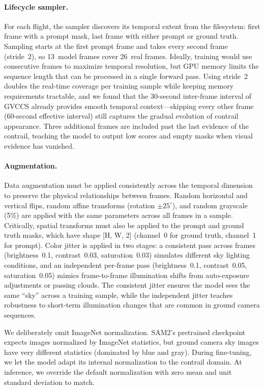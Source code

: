 \documentclass[review]{elsarticle}
\begin{document}
\paragraph{Lifecycle sampler.} For each flight, the sampler discovers its temporal extent from the filesystem: first frame with a prompt mask, last frame with either prompt or ground truth. Sampling starts at the first prompt frame and takes every second frame (stride~2), so 13~model frames cover 26~real frames. Ideally, training would use consecutive frames to maximize temporal resolution, but GPU memory limits the sequence length that can be processed in a single forward pass. Using stride~2 doubles the real-time coverage per training sample while keeping memory requirements tractable, and we found that the 30-second inter-frame interval of GVCCS already provides smooth temporal context---skipping every other frame (60-second effective interval) still captures the gradual evolution of contrail appearance. Three additional frames are included past the last evidence of the contrail, teaching the model to output low scores and empty masks when visual evidence has vanished.

\paragraph{Augmentation.} Data augmentation must be applied consistently across the temporal dimension to preserve the physical relationships between frames. Random horizontal and vertical flips, random affine transforms (rotation $\pm 25^{\circ}$), and random grayscale (5\%) are applied with the same parameters across all frames in a sample. Critically, spatial transforms must also be applied to the prompt and ground truth masks, which have shape [H, W, 2] (channel~0 for ground truth, channel~1 for prompt). Color jitter is applied in two stages: a consistent pass across frames (brightness~0.1, contrast~0.03, saturation~0.03) simulates different sky lighting conditions, and an independent per-frame pass (brightness~0.1, contrast~0.05, saturation~0.05) mimics frame-to-frame illumination shifts from auto-exposure adjustments or passing clouds. The consistent jitter ensures the model sees the same ``sky'' across a training sample, while the independent jitter teaches robustness to short-term illumination changes that are common in ground camera sequences.

We deliberately omit ImageNet normalization. SAM2's pretrained checkpoint expects images normalized by ImageNet statistics, but ground camera sky images have very different statistics (dominated by blue and gray). During fine-tuning, we let the model adapt its internal normalization to the contrail domain. At inference, we override the default normalization with zero mean and unit standard deviation to match.
\end{document}
